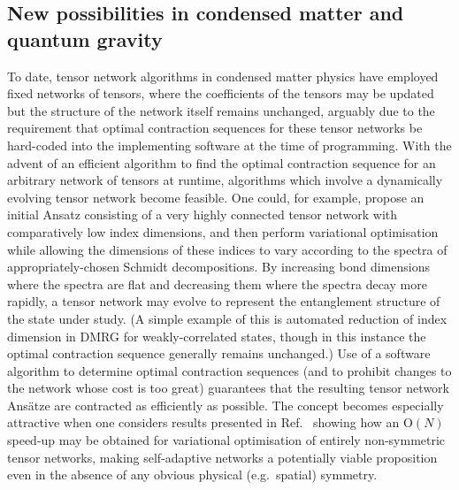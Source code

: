 \documentclass[aps,pre,reprint,superscriptaddress,amsfonts,amsmath,showpacs,nofootinbib,floatfix]{revtex4-1}
\newcommand{\mrm}[1]{\mathrm{#1}}
\newcommand{\rcite}[1]{Ref.~\onlinecite{#1}}
\newcommand{\OO}[1]{\mrm{O}(#1)}
\begin{document}
\subsection{New possibilities in condensed matter and quantum gravity}

To date, tensor network algorithms in condensed matter physics have employed fixed networks of tensors, where the coefficients of the tensors may be updated but the structure of the network itself remains unchanged, arguably due to the requirement that optimal contraction sequences for these tensor networks be hard-coded into the implementing software at the time of programming. With the advent of an efficient algorithm to find the optimal contraction sequence for an arbitrary network of tensors at runtime, algorithms which involve a dynamically evolving tensor network become feasible. One could, for example, propose an initial Ansatz consisting of a very highly connected tensor network with comparatively low index dimensions, and then perform variational optimisation while allowing the dimensions of these indices to vary according to the spectra of appropriately-chosen Schmidt decompositions. 
By increasing bond dimensions where the spectra are flat and decreasing them where the spectra decay more rapidly, a tensor network may evolve to represent the entanglement structure of the state under study. 
(A simple example of this is automated reduction of index dimension in DMRG for weakly-correlated states, though in this instance the optimal contraction sequence generally remains unchanged.) 
Use of a software algorithm to determine optimal contraction sequences (and to prohibit changes to the network whose cost is too great) guarantees that the resulting tensor network Ans\"atze are contracted as efficiently as possible. The concept becomes especially attractive when one considers results presented in \rcite{evenbly2014} showing how an $\OO{N}$ speed-up may be obtained for variational optimisation of entirely non-symmetric tensor networks, making self-adaptive networks a potentially viable proposition even in the absence of any obvious physical (e.g.~spatial) symmetry.
\end{document}
